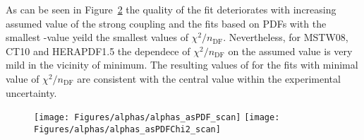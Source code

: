 As can be seen in Figure~\ref{fig:aschi2scanpdf1} the quality of the fit deteriorates with increasing assumed value of the strong coupling and the fits based on PDFs with the smallest \asz-value yeild the smallest values of $\chi^2/n_\text{DF}$. Nevertheless, for MSTW08, CT10 and HERAPDF1.5 the dependece of $\chi^2/n_\text{DF}$ on the assumed value is very mild in the vicinity of minimum. The resulting values of \as for the fits with minimal value of $\chi^2/n_\text{DF}$ are consistent with the central value within the experimental uncertainty.

\begin{figure}[t]
 \centering
 \texttt{[image: Figures/alphas/alphas\_asPDF\_scan]}
 \texttt{[image: Figures/alphas/alphas\_asPDFChi2\_scan]}
 \caption{}
 \label{fig:aschi2scanpdf}
\end{figure}

\begin{figure}[t]
 \centering
 
 \caption{}
 \label{fig:aschi2scanpdf1}
\end{figure}